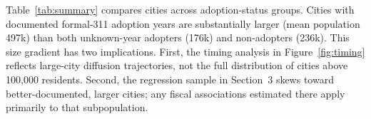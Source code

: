 Table~\ref{tab:summary} compares cities across adoption-status groups.
Cities with documented formal-311 adoption years are substantially larger (mean
population 497k) than both unknown-year adopters (176k) and non-adopters (236k).
This size gradient has two implications.
First, the timing analysis in Figure~\ref{fig:timing} reflects large-city diffusion
trajectories, not the full distribution of cities above 100{,}000 residents.
Second, the regression sample in Section~3 skews toward better-documented, larger
cities; any fiscal associations estimated there apply primarily to that subpopulation.

\begin{table}[H]
  \centering
  \caption{City characteristics by 311 adoption status.
    Population in thousands.
    Regional shares are within-group: the percentage of each group's cities
    located in each Census region.}
  \label{tab:summary}
  \resizebox{\textwidth}{!}{%
  }
\end{table}
